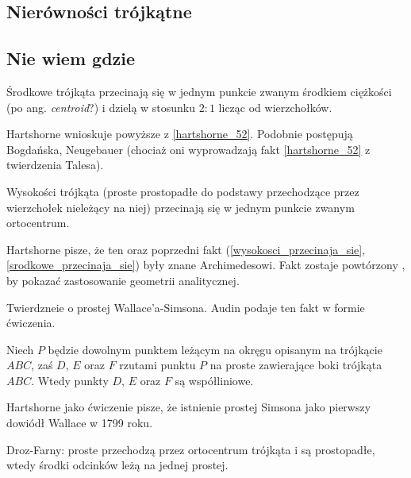 \subsection{Nierówności trójkątne}


\subsection{Nie wiem gdzie}

\begin{proposition}
	\label{srodkowe_przecinaja_sie}
	Środkowe trójkąta przecinają się w jednym punkcie zwanym środkiem ciężkości (po ang. \emph{centroid}?) i dzielą w stosunku $2 : 1$ licząc od wierzchołków.
\end{proposition}

Hartshorne \cite[s. 53, 54]{hartshorne2000} wnioskuje powyższe z \ref{hartshorne_52}.
Podobnie postępują Bogdańska, Neugebauer (chociaż oni wyprowadzają fakt \ref{hartshorne_52} z twierdzenia Talesa).

\begin{proposition}
	\label{wysokosci_przecinaja_sie}
	Wysokości trójkąta (proste prostopadłe do podstawy przechodzące przez wierzchołek nieleżący na niej) przecinają się w jednym punkcie zwanym ortocentrum.
\end{proposition}

Hartshorne \cite[s. 52, 54]{hartshorne2000} pisze, że ten oraz poprzedni fakt (\ref{wysokosci_przecinaja_sie}, \ref{srodkowe_przecinaja_sie}) były znane Archimedesowi.
Fakt zostaje powtórzony \cite[s. 119-120]{hartshorne2000}, by pokazać zastosowanie geometrii analitycznej.

Twierdzneie o prostej Wallace'a-Simsona. %
Audin \cite[s. 104]{audin_2003} podaje ten fakt w formie ćwiczenia.


\begin{proposition}
	Niech $P$ będzie dowolnym punktem leżącym na okręgu opisanym na trójkącie $ABC$, zaś $D$, $E$ oraz $F$ rzutami punktu $P$ na proste zawierające boki trójkąta $ABC$.
	Wtedy punkty $D$, $E$ oraz $F$ są współliniowe.
\end{proposition}

Hartshorne jako ćwiczenie \cite[s. 61]{hartshorne2000} pisze, że istnienie prostej Simsona jako pierwszy dowiódł Wallace w 1799 roku.


Droz-Farny: proste przechodzą przez ortocentrum trójkąta i są prostopadłe, wtedy środki odcinków leżą na jednej prostej. %

%

